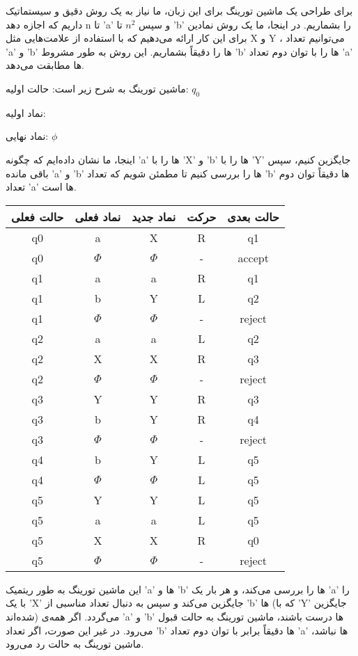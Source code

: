 برای طراحی یک ماشین تورینگ برای این زبان، ما نیاز به یک روش دقیق و سیستماتیک داریم که اجازه دهد n تا 'a' و سپس
$n^2$
تا 'b' را بشماریم. در اینجا، ما یک روش نمادین برای این کار ارائه می‌دهیم که با استفاده از علامت‌هایی مثل X و Y ، می‌توانیم تعداد 'a' و 'b' ها را دقیقاً بشماریم. این روش به طور مشروط 'b' ها را با توان دوم تعداد 'a' ها مطابقت می‌دهد.

ماشین تورینگ به شرح زیر است:
حالت اولیه:
$q_0$

نماد اولیه:

نماد نهایی: 
$\phi$

اینجا، ما نشان داده‌ایم که چگونه 'a' ها را با 'X' و 'b' ها را با 'Y' جایگزین کنیم، سپس باقی مانده 'a' و 'b' ها را بررسی کنیم تا مطمئن شویم که تعداد 'b' ها دقیقاً توان دوم تعداد 'a' ها است.


\begin{tabular}{|c|c|c|c|c|}
	\hline
	حالت فعلی & نماد فعلی & نماد جدید & حرکت & حالت بعدی \\
	\hline
	q0 & a & X & R & q1 \\
	q0 & $\Phi$ & $\Phi$ & - & accept \\
	q1 & a & a & R & q1 \\
	q1 & b & Y & L & q2 \\
	q1 & $\Phi$ & $\Phi$ & - & reject \\
	q2 & a & a & L & q2 \\
	q2 & X & X & R & q3 \\
	q2 & $\Phi$ & $\Phi$ & - & reject \\
	q3 & Y & Y & R & q3 \\
	q3 & b & Y & R & q4 \\
	q3 & $\Phi$ & $\Phi$ & - & reject \\
	q4 & b & Y & L & q5 \\
	q4 & $\Phi$ & $\Phi$ & L & q5 \\
	q5 & Y & Y & L & q5 \\
	q5 & a & a & L & q5 \\
	q5 & X & X & R & q0 \\
	q5 & $\Phi$ & $\Phi$ & - & reject \\
	\hline
\end{tabular}

این ماشین تورینگ به طور ریتمیک 'a' ها و 'b' ها را بررسی می‌کند، و هر بار یک 'a' را با یک 'X' جایگزین می‌کند و سپس به دنبال تعداد مناسبی از 'b' ها (که با 'Y' جایگزین شده‌اند) می‌گردد. اگر همه‌ی 'a' و 'b' ها درست باشند، ماشین تورینگ به حالت قبول می‌رود. در غیر این صورت، اگر تعداد 'b' ها دقیقاً برابر با توان دوم تعداد 'a' ها نباشد، ماشین تورینگ به حالت رد می‌رود.

